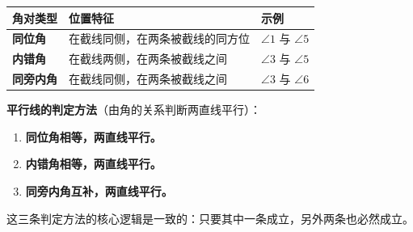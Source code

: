 \begin{understand}
\begin{center}
\begin{tabular}{lll}
\toprule
角对类型 & 位置特征 & 示例 \\
\midrule
\textbf{同位角} & 在截线同侧，在两条被截线的同方位 & $\angle 1$ 与 $\angle 5$ \\
\textbf{内错角} & 在截线两侧，在两条被截线之间 & $\angle 3$ 与 $\angle 5$ \\
\textbf{同旁内角} & 在截线同侧，在两条被截线之间 & $\angle 3$ 与 $\angle 6$ \\
\bottomrule
\end{tabular}
\end{center}


\textbf{平行线的判定方法}（由角的关系判断两直线平行）：

\begin{enumerate}
  \item \textbf{同位角相等，两直线平行。}
  \item \textbf{内错角相等，两直线平行。}
  \item \textbf{同旁内角互补，两直线平行。}
\end{enumerate}


这三条判定方法的核心逻辑是一致的：只要其中一条成立，另外两条也必然成立。

\end{understand}

